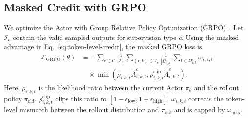 \documentclass[letterpaper]{article} %
\begin{document}
\subsection{Masked Credit with GRPO}
We optimize the Actor with Group Relative Policy Optimization
(GRPO)~\citep{shao2024deepseekmath}. Let $\mathcal{I}_c$ contain the valid
sampled outputs for supervision type $c$. Using the masked advantage in
Eq.~\eqref{eq:token-level-credit}, the masked GRPO loss is
\begin{equation}
\begin{aligned}
    \mathcal{L}_{\mathrm{GRPO}}(\theta)
        &=-\sum_{c\in\mathcal{C}}\frac{1}{|\mathcal{I}_c|}
        \sum_{(i,k)\in\mathcal{I}_c}
        \frac{1}{|\Omega_{i,k}^c|}
        \sum_{t\in\Omega_{i,k}^c}\omega_{i,k,t}\\
        &\quad{}\times
        \min\left(
            \rho_{i,k,t}\widetilde A_{i,k,t}^c,
            \rho_{i,k,t}^{\mathrm{clip}}\widetilde A_{i,k,t}^c
        \right).
\end{aligned}
    \label{eq:masked-grpo-loss}
\end{equation}
Here, $\rho_{i,k,t}$ is the likelihood ratio between the current Actor
$\pi_\theta$ and the rollout policy $\pi_{\mathrm{old}}$.
$\rho_{i,k,t}^{\mathrm{clip}}$ clips this ratio to
$[1-\epsilon_{\mathrm{low}},1+\epsilon_{\mathrm{high}}]$.
$\omega_{i,k,t}$ corrects the token-level mismatch between the rollout
distribution and $\pi_{\mathrm{old}}$ and is capped by $\omega_{\max}$.
\end{document}
